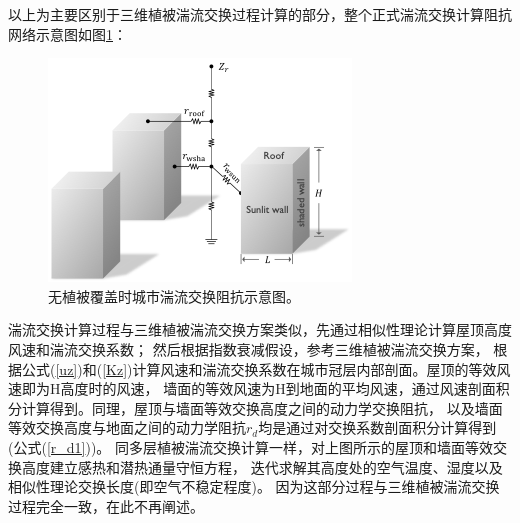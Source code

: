 以上为主要区别于三维植被湍流交换过程计算的部分，整个正式湍流交换计算阻抗网络示意图如图\ref{fig:无植被覆盖时城市湍流交换阻抗示意图}：
{
\begin{figure}[]
\centering
\includegraphics{Figures/城市模式/无植被覆盖时城市湍流交换阻抗示意图.png}
\caption{无植被覆盖时城市湍流交换阻抗示意图。}
\label{fig:无植被覆盖时城市湍流交换阻抗示意图}
\end{figure}
}
湍流交换计算过程与三维植被湍流交换方案类似，先通过相似性理论计算屋顶高度风速和湍流交换系数；
然后根据指数衰减假设，参考三维植被湍流交换方案\citep{dai2019different}，
根据公式(\ref{uz})和(\ref{Kz})计算风速和湍流交换系数在城市冠层内部剖面。屋顶的等效风速即为H高度时的风速，
墙面的等效风速为H到地面的平均风速，通过风速剖面积分计算得到。同理，屋顶与墙面等效交换高度之间的动力学交换阻抗，
以及墙面等效交换高度与地面之间的动力学阻抗$r_d$均是通过对交换系数剖面积分计算得到(公式(\ref{r_d1}))。
同多层植被湍流交换计算一样，对上图所示的屋顶和墙面等效交换高度建立感热和潜热通量守恒方程，
迭代求解其高度处的空气温度、湿度以及相似性理论交换长度(即空气不稳定程度)。
因为这部分过程与三维植被湍流交换过程完全一致，在此不再阐述。
